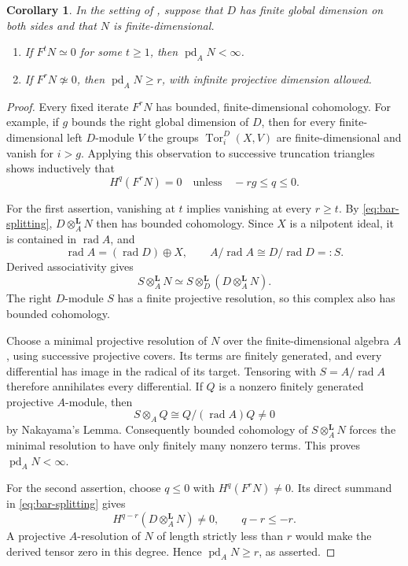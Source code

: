 \documentclass[11pt]{article}
\numberwithin{equation}{section}
\newtheorem{corollary}[theorem]{Corollary}
\theoremstyle{definition}
\theoremstyle{remark}
\newcommand{\otL}{\otimes^{\mathbf L}}
\DeclareMathOperator{\Tor}{Tor}
\DeclareMathOperator{\pd}{pd}
\DeclareMathOperator{\rad}{rad}
\begin{document}
\begin{corollary}
\label{cor:pd-detection}
In the setting of , suppose that
\(D\) has finite global dimension on both sides and that
\(N\) is finite-dimensional.
\begin{enumerate}
\item If \(F^tN\simeq0\) for some \(t\ge1\), then
      \(\pd_A N<\infty\).
\item If \(F^rN\not\simeq0\), then \(\pd_A N\ge r\),
      with infinite projective dimension allowed.
\end{enumerate}
\end{corollary}

\begin{proof}
Every fixed iterate \(F^rN\) has bounded,
finite-dimensional cohomology.
For example, if \(g\) bounds the right global dimension
of \(D\), then for every finite-dimensional left
\(D\)-module \(V\) the groups
\(\Tor_i^D(X,V)\) are finite-dimensional and vanish for
\(i>g\).  Applying this observation to successive
truncation triangles shows inductively that
\[
H^q(F^rN)=0\quad\text{unless}\quad -rg\le q\le0.
\]

For the first assertion, vanishing at \(t\) implies
vanishing at every \(r\ge t\).
By \eqref{eq:bar-splitting},
\(D\otL_AN\) then has bounded cohomology.
Since \(X\) is a nilpotent ideal, it is contained in
\(\rad A\), and
\[
\rad A=(\rad D)\oplus X,
\qquad A/\rad A\cong D/\rad D=:S.
\]
Derived associativity gives
\[
S\otL_A N
\simeq S\otL_D(D\otL_A N).
\]
The right \(D\)-module \(S\) has a finite projective
resolution, so this complex also has bounded cohomology.

Choose a minimal projective resolution of \(N\) over
the finite-dimensional algebra \(A\), using successive
projective covers.  Its terms are finitely generated,
and every differential has image in the radical of
its target.  Tensoring with \(S=A/\rad A\) therefore
annihilates every differential.  If \(Q\) is a nonzero
finitely generated projective \(A\)-module, then
\[
S\otimes_A Q\cong Q/(\rad A)Q\ne0
\]
by Nakayama's Lemma.  Consequently bounded cohomology
of \(S\otL_AN\) forces the minimal resolution to have
only finitely many nonzero terms.  This proves
\(\pd_A N<\infty\).

For the second assertion, choose \(q\le0\) with
\(H^q(F^rN)\ne0\).  Its direct summand in
\eqref{eq:bar-splitting} gives
\[
H^{q-r}(D\otL_A N)\ne0,\qquad q-r\le-r.
\]
A projective \(A\)-resolution of \(N\) of length
strictly less than \(r\) would make the derived
tensor zero in this degree.  Hence
\(\pd_A N\ge r\), as asserted.
\end{proof}
\end{document}
